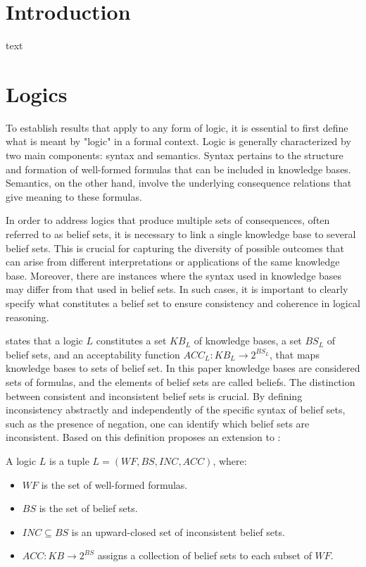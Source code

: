 \section{Introduction}
text

\section{Logics}
To establish results that apply to any form of logic, it is essential to first define what is meant by "logic" in a formal context.
Logic is generally characterized by two main components: syntax and semantics.
Syntax pertains to the structure and formation of well-formed formulas that can be included in knowledge bases.
Semantics, on the other hand, involve the underlying consequence relations that give meaning to these formulas.

In order to address logics that produce multiple sets of consequences, often referred to as belief sets, it is necessary to link a single knowledge base to several belief sets.
This is crucial for capturing the diversity of possible outcomes that can arise from different interpretations or applications of the same knowledge base.
Moreover, there are instances where the syntax used in knowledge bases may differ from that used in belief sets.
In such cases, it is important to clearly specify what constitutes a belief set to ensure consistency and coherence in logical reasoning.

\cite{brewka_equilibria_2007} states that a logic \(L\) constitutes a set \(KB_L\) of knowledge bases, a set \(BS_L\) of belief sets, and an acceptability function \(ACC_L: KB_L \to 2^{BS_L}\), that maps knowledge bases to sets of belief set.
In this paper knowledge bases are considered sets of formulas, and the elements of belief sets are called beliefs.
The distinction between consistent and inconsistent belief sets is crucial.
By defining inconsistency abstractly and independently of the specific syntax of belief sets, such as the presence of negation, one can identify which belief sets are inconsistent.
Based on this definition \cite{brewka_strong_2019} proposes an extension to \cite{brewka_equilibria_2007}:

A logic \(L\) is a tuple \(L = (WF, BS, INC, ACC)\), where:
\begin{itemize}
      \item \(WF\) is the set of well-formed formulas.
      \item \(BS\) is the set of belief sets.
      \item \(INC \subseteq BS\) is an upward-closed set of inconsistent belief sets.
      \item \(ACC: KB \to 2^{BS}\) assigns a collection of belief sets to each subset of \(WF\).
\end{itemize}

